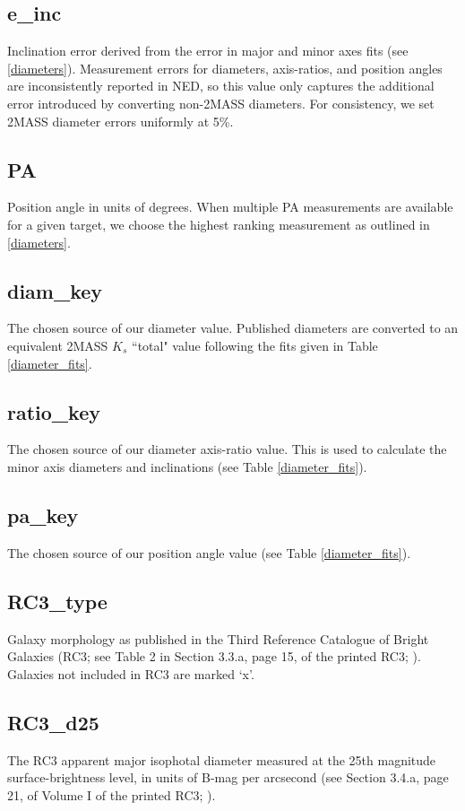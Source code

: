 \subsection{e\_inc} \label{e_inc}
Inclination error derived from the error in major and minor axes fits (see \ref{diameters}). Measurement errors for diameters, axis-ratios, and position angles are inconsistently reported in NED, so this value only captures the additional error introduced by converting non-2MASS diameters. For consistency, we set 2MASS diameter errors uniformly at 5\%.

\subsection{PA} \label{PA}
Position angle in units of degrees. When multiple PA measurements are available for a given target, we choose the highest ranking measurement as outlined in \ref{diameters}.

\subsection{diam\_key} \label{diameter_key}
The chosen source of our diameter value. Published diameters are converted to an equivalent 2MASS $K_s$ ``total" value following the fits given in Table \ref{diameter_fits}.

\subsection{ratio\_key} \label{ratio_key}
The chosen source of our diameter axis-ratio value. This is used to calculate the minor axis diameters and inclinations (see Table \ref{diameter_fits}).

\subsection{pa\_key} \label{pa_key}
The chosen source of our position angle value (see Table \ref{diameter_fits}).

\subsection{RC3\_type} \label{RC3_type}
Galaxy morphology as published in the Third Reference Catalogue of Bright Galaxies (RC3; see Table 2 in Section 3.3.a, page 15, of the printed RC3; \citealt{RC3}). Galaxies not included in RC3 are marked `x'.

\subsection{RC3\_d25} \label{RC3_d25}
The RC3 apparent major isophotal diameter measured at the 25th magnitude surface-brightness level, in units of B-mag per arcsecond (see Section 3.4.a, page 21, of Volume I of the printed RC3; \citealt{RC3}).

